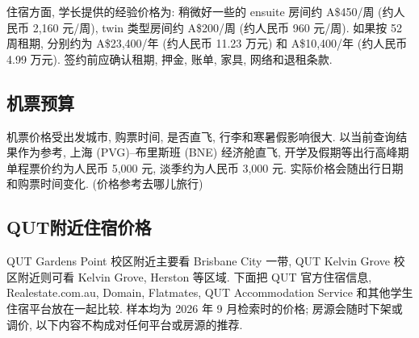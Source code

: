 \documentclass[UTF8,a4paper,12pt]{ctexart}
\newif\ifcourseopen
\newif\ifcourseheaderprinted
\newcounter{courseitem}
\newcommand{\finishcourse}{%
 \ifcourseopen
 \par\end{minipage}\end{tcolorbox}%
 \courseopenfalse
 \fi
}
\newcommand{\coursereset}{\finishcourse\setcounter{courseitem}{0}\courseheaderprintedfalse}
\let\origsubsection\subsection
\renewcommand{\subsection}{\coursereset\origsubsection}
\begin{document}
住宿方面, 学长提供的经验价格为: 稍微好一些的 ensuite 房间约 A\$450/周 (约人民币 2,160 元/周), twin 类型房间约 A\$200/周 (约人民币 960 元/周). 如果按 52 周租期, 分别约为 A\$23,400/年 (约人民币 11.23 万元) 和 A\$10,400/年 (约人民币 4.99 万元). 签约前应确认租期, 押金, 账单, 家具, 网络和退租条款.

\subsection{机票预算}

机票价格受出发城市, 购票时间, 是否直飞, 行李和寒暑假影响很大. 以当前查询结果作为参考, 上海 (PVG)--布里斯班 (BNE) 经济舱直飞, 开学及假期等出行高峰期单程票价约为人民币 5,000 元, 淡季约为人民币 3,000 元. 实际价格会随出行日期和购票时间变化. (价格参考去哪儿旅行)

\subsection{QUT附近住宿价格}

QUT Gardens Point 校区附近主要看 Brisbane City 一带, QUT Kelvin Grove 校区附近则可看 Kelvin Grove, Herston 等区域. 下面把 QUT 官方住宿信息, Realestate.com.au, Domain, Flatmates, QUT Accommodation Service 和其他学生住宿平台放在一起比较. 样本均为 2026 年 9 月检索时的价格; 房源会随时下架或调价, 以下内容不构成对任何平台或房源的推荐.
\end{document}
